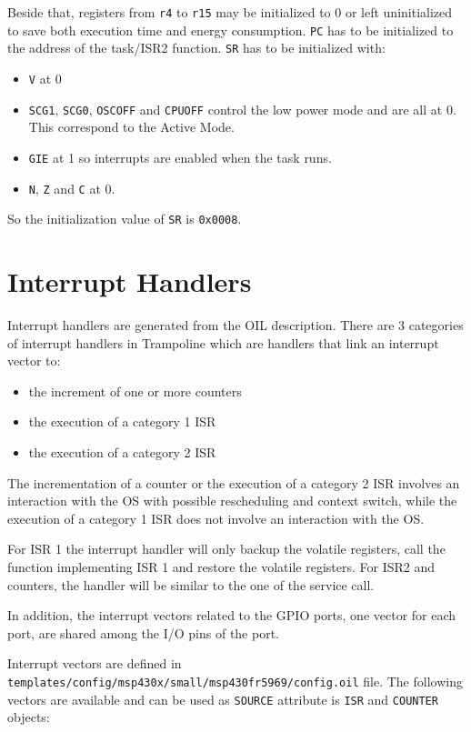\documentclass[11pt, oneside]{article}   	%
\begin{document}
Beside that, registers from \lstinline{r4} to \lstinline{r15} may be initialized to 0 or left uninitialized to save both execution time and energy consumption. \lstinline{PC} has to be initialized to the address of the task/ISR2 function. \lstinline{SR} has to be initialized with:
\begin{itemize}
\item \lstinline{V} at 0
\item \lstinline{SCG1}, \lstinline{SCG0}, \lstinline{OSCOFF} and \lstinline{CPUOFF} control the low power mode and are all at 0. This correspond to the Active Mode.
\item \lstinline{GIE} at 1 so interrupts are enabled when the task runs.
\item \lstinline{N}, \lstinline{Z} and \lstinline{C} at 0.
\end{itemize}

So the initialization value of \lstinline{SR} is \lstinline{0x0008}. 


\section{Interrupt Handlers}

Interrupt handlers are generated from the OIL description.
There are 3 categories of interrupt handlers in Trampoline which are handlers that link an interrupt vector to:
\begin{itemize}[noitemsep,topsep=.25em]
\item  the increment of one or more counters
\item  the execution of a category 1 ISR
\item  the execution of a category 2 ISR
\end{itemize}

The incrementation of a counter or the execution of a category 2 ISR involves an interaction with the OS with possible rescheduling and context switch, while the execution of a category 1 ISR does not involve an interaction with the OS.

For ISR 1 the interrupt handler will only backup the volatile registers, call the function implementing ISR 1 and restore the volatile registers. For ISR2 and counters, the handler will be similar to the one of the service call.

In addition, the interrupt vectors related to the GPIO ports, one vector for each port, are shared among the I/O pins of the port.

Interrupt vectors are defined in \lstinline{templates/config/msp430x/small/msp430fr5969/config.oil} file. The following vectors are available and can be used as \lstinline{SOURCE} attribute is \lstinline{ISR} and \lstinline{COUNTER} objects:
\end{document}
